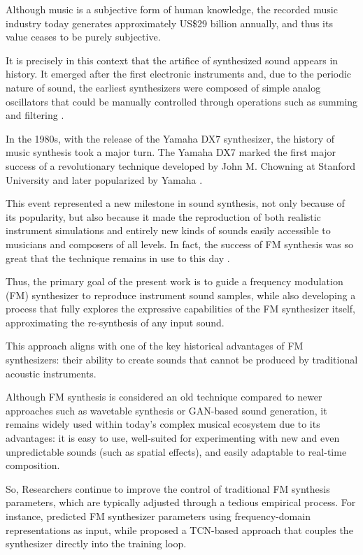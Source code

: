 \documentclass[10pt,conference]{IEEEtran}
\begin{document}
Although music is a subjective form of human knowledge, the recorded music industry today generates approximately US\$29 billion \cite{ifpi2025} annually, and thus its value ceases to be purely subjective.

It is precisely in this context that the artifice of synthesized sound appears in history. It emerged after the first electronic instruments and, due to the periodic nature of sound, the earliest synthesizers were composed of simple analog oscillators that could be manually controlled through operations such as summing and filtering \cite{holmes2016electronic}.

In the 1980s, with the release of the Yamaha DX7 synthesizer, the history of music synthesis took a major turn. The Yamaha DX7 marked the first major success of a revolutionary technique developed by John M. Chowning at Stanford University and later popularized by Yamaha \cite{claesson2021resynthesis}.

This event represented a new milestone in sound synthesis, not only because of its popularity, but also because it made the reproduction of both realistic instrument simulations and entirely new kinds of sounds easily accessible to musicians and composers of all levels. In fact, the success of FM synthesis was so great that the technique remains in use to this day \cite{holmes2016electronic}.

Thus, the primary goal of the present work is to guide a frequency modulation (FM) synthesizer to reproduce instrument sound samples, while also developing a process that fully explores the expressive capabilities of the FM synthesizer itself, approximating the re-synthesis of any input sound.

This approach aligns with one of the key historical advantages of FM synthesizers: their ability to create sounds that cannot be produced by traditional acoustic instruments.

Although FM synthesis is considered an old technique compared to newer approaches such as wavetable synthesis or GAN-based sound generation, it remains widely used within today’s complex musical ecosystem due to its advantages: it is easy to use, well-suited for experimenting with new and even unpredictable sounds (such as spatial effects), and easily adaptable to real-time composition.

So, Researchers continue to improve the control of traditional FM synthesis parameters, which are typically adjusted through a tedious empirical process. For instance, \cite{claesson2021resynthesis} predicted FM synthesizer parameters using frequency-domain representations as input, while \cite{steinmetz2022ddx7} proposed a TCN-based approach that couples the synthesizer directly into the training loop.
\end{document}
